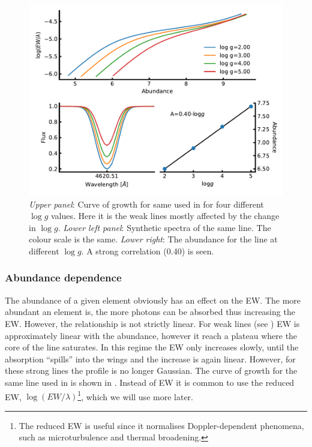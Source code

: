 {\begin{figure}[htpb!]
    \centering
    \includegraphics[width=0.85\linewidth]{figures/ewGravity.pdf}
    \caption{\emph{Upper panel}: Curve of growth for same  used in  for
                                 four different $\log g$ values. Here it is the weak lines mostly
                                 affected by the change in $\log g$.
             \emph{Lower left panel}: Synthetic spectra of the same line. The colour scale is the
                                      same.
             \emph{Lower right}: The abundance for the line at different $\log g$. A strong
                                 correlation (0.40) is seen.}
    \label{fig:ewGravity}
\end{figure}




\subsubsection{Abundance dependence}

The abundance of a given element obviously has an effect on the EW. The more abundant an element is,
the more photons can be absorbed thus increasing the EW. However, the relationship is not strictly
linear. For weak lines (see ) EW is approximately linear with the abundance, however
it reach a plateau where the core of the line saturates. In this regime the EW only increases
slowly, until the absorption ``spills'' into the wings and the increase is again linear. However,
for these strong lines the profile is no longer Gaussian. The curve of growth for the same
 line used in  is shown in . Instead of EW it is common to
use the reduced EW, $\log (EW/\lambda)$\footnote{The reduced EW is useful since it normalises
Doppler-dependent phenomena, such as microturbulence and thermal broadening.}, which we will use
more later.

}
